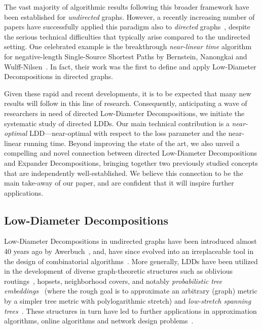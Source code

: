\documentclass[letterpaper,11pt]{article}
\begin{document}
The vast majority of algorithmic results following this broader framework have been established for \emph{undirected} graphs. However, a recently increasing number of papers have successfully applied this paradigm also to \emph{directed} graphs~\cite{BernsteinGS20,BernsteinNW22,HuaKGW23,ChuzhoyK24,BernsteinBST24}, despite the serious technical difficulties that typically arise compared to the undirected setting. One celebrated example is the breakthrough \emph{near-linear time} algorithm for negative-length Single-Source Shortest Paths by Bernstein, Nanongkai and Wulff-Nilsen~\cite{BernsteinNW22}. In fact, their work was the first to define and apply Low-Diameter Decompositions in directed graphs.

Given these rapid and recent developments, it is to be expected that many new results will follow in this line of research. Consequently, anticipating a wave of researchers in need of directed Low-Diameter Decompositions, we initiate the systematic study of directed LDDs. Our main technical contribution is a \emph{near-optimal} LDD---near-optimal with respect to the loss parameter and the near-linear running time. Beyond improving the state of the art, we also unveil a compelling and novel connection between directed Low-Diameter Decompositions and Expander Decompositions, bringing together two previously studied concepts that are independently well-established. We believe this connection to be the main take-away of our paper, and are confident that it will inspire further applications. 

\subsection{Low-Diameter Decompositions} \label{sec:intro:sec:ldd}
Low-Diameter Decompositions in undirected graphs have been introduced almost 40 years ago by Awerbuch~\cite{Awerbuch85}, and, have since evolved into an irreplaceable tool in the design of combinatorial algorithms~\cite{AwerbuchGLP89,AwerbuchP92,AwerbuchBCP92,LinialS93,Bartal96,BlellochGKMPT14,MillerPX13,PachockiRSTW18,ForsterG19,ChechikZ20,BernsteinGW20,ForsterGV21,BernsteinNW22}. More generally, LDDs have been utilized in the development of diverse graph-theoretic structures such as oblivious routings~\cite{ZuzicGYHS22}, hopsets, neighborhood covers, and notably \emph{probabilistic tree embeddings}~\cite{Bartal96,Bartal98,FakcharoenpholRT04} (where the rough goal is to approximate an arbitrary (graph) metric by a simpler tree metric with polylogarithmic stretch) and \emph{low-stretch spanning trees}~\cite{AlonKPW95,ElkinEST08,AbrahamBN08,KoutisMP11,AbrahamN19,AbrahamCEFN20}. These structures in turn have led to further applications in approximation algorithms, online algorithms and network design problems~\cite{Bartal96,BorodinY98,HaeuplerHZ21}.
\end{document}
